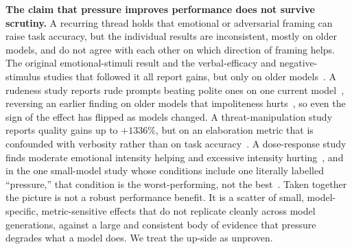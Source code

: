 \textbf{The claim that pressure improves performance does not survive scrutiny.} A recurring thread holds that emotional or adversarial framing can raise task accuracy, but the individual results are inconsistent, mostly on older models, and do not agree with each other on which direction of framing helps. The original emotional-stimuli result and the verbal-efficacy and negative-stimulus studies that followed it all report gains, but only on older models~\citep{LLMsUnderstandAndCan_Li, BoostingSelfEfficacyAnd_Chen, NegativePromptLeveragingPsychology_Wang}. A rudeness study reports rude prompts beating polite ones on one current model~\citep{MindYourToneRudeness_Dobariya}, reversing an earlier finding on older models that impoliteness hurts~\citep{ShouldWeRespectLLMs_Yin}, so even the sign of the effect has flipped as models changed. A threat-manipulation study reports quality gains up to $+1336\%$, but on an elaboration metric that is confounded with verbosity rather than on task accuracy~\citep{AnalysisOfThreatBased_Samancioglu}. A dose-response study finds moderate emotional intensity helping and excessive intensity hurting~\citep{RoleOfEmotionalStimuli_Patel}, and in the one small-model study whose conditions include one literally labelled ``pressure,'' that condition is the worst-performing, not the best~\citep{UnderPressureEmotionalFraming_Usman}. Taken together the picture is not a robust performance benefit. It is a scatter of small, model-specific, metric-sensitive effects that do not replicate cleanly across model generations, against a large and consistent body of evidence that pressure degrades what a model does. We treat the up-side as unproven.
